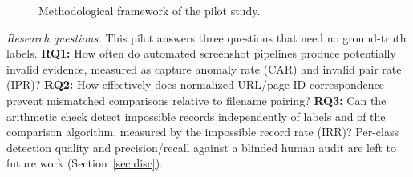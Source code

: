 \documentclass[conference]{IEEEtran}
\newcommand{\Dw}{D_{\mathrm{raw}}}
\begin{document}
\begin{figure}[!t]
\centering
{}
\caption{Methodological framework of the pilot study.}
\label{fig:method}
\end{figure}

\textit{Research questions.} This pilot answers three questions that need no ground-truth labels. \textbf{RQ1:} How often do automated screenshot pipelines produce potentially invalid evidence, measured as capture anomaly rate (CAR) and invalid pair rate (IPR)? \textbf{RQ2:} How effectively does normalized-URL/page-ID correspondence prevent mismatched comparisons relative to filename pairing? \textbf{RQ3:} Can the arithmetic check detect impossible records independently of labels and of the comparison algorithm, measured by the impossible record rate (IRR)? Per-class detection quality and precision/recall against a blinded human audit are left to future work (Section~\ref{sec:disc}).
\end{document}
